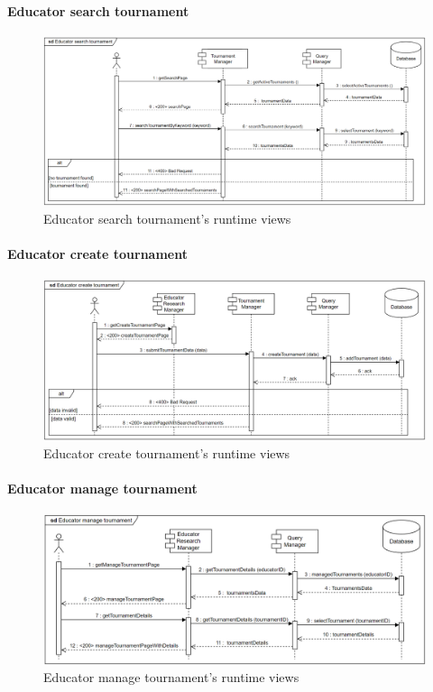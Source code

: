 \documentclass[12pt, a4paper]{report}
\begin{document}
    \paragraph*{Educator search tournament}
    \begin{figure}[H]
        \centering
        \includegraphics[width=1.0\linewidth]{images/estrv.png}
        \caption{Educator search tournament's runtime views}
    \end{figure}

    \paragraph*{Educator create tournament}
    \begin{figure}[H]
        \centering
        \includegraphics[width=1.0\linewidth]{images/ectrv.png}
        \caption{Educator create tournament's runtime views}
    \end{figure}

    \paragraph*{Educator manage tournament}
    \begin{figure}[H]
        \centering
        \includegraphics[width=1.0\linewidth]{images/emtrv.png}
        \caption{Educator manage tournament's runtime views}
    \end{figure}
\end{document}
